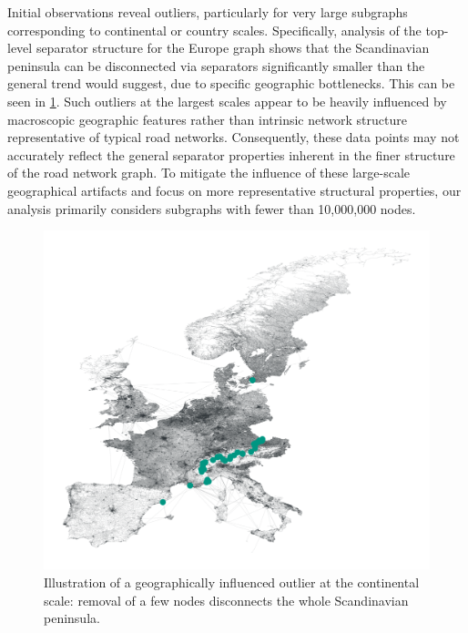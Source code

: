 Initial observations reveal outliers, particularly for very large subgraphs corresponding to continental or country scales.
Specifically, analysis of the top-level separator structure for the Europe graph shows that the Scandinavian peninsula can be disconnected via separators significantly smaller than the general trend would suggest, due to specific geographic bottlenecks.
This can be seen in \cref{fig:europe_top_separator}.
Such outliers at the largest scales appear to be heavily influenced by macroscopic geographic features rather than intrinsic network structure representative of typical road networks.
Consequently, these data points may not accurately reflect the general separator properties inherent in the finer structure of the road network graph.
To mitigate the influence of these large-scale geographical artifacts and focus on more representative structural properties, our analysis primarily considers subgraphs with fewer than 10,000,000 nodes.

\begin{figure}
	\centering
	\includegraphics[width=0.6\linewidth]{graphics/europe-top-level-sep.png}
	\caption{Illustration of a geographically influenced outlier at the continental scale: removal of a few nodes disconnects the whole Scandinavian peninsula.}
	\label{fig:europe_top_separator}
\end{figure}

